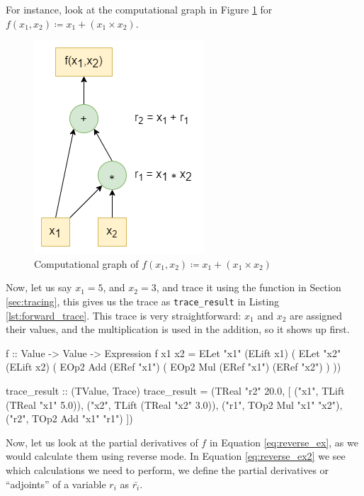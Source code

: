     For instance, look at the computational graph in Figure \ref{fig:forward_graph} for $f(x_1,x_2)\coloneqq x_1+(x_1\times x_2)$.
    \begin{figure}[htb]
        \centering
        \includegraphics[scale=0.5]{diagrams/forward_example.png}
        \caption{Computational graph of $f(x_1,x_2)\coloneqq x_1+(x_1\times x_2)$}
        \label{fig:forward_graph}
    \end{figure}
    Now, let us say $x_1=5$, and $x_2=3$, and trace it using the function in Section \ref{sec:tracing}, this gives us the trace as \texttt{trace\_result} in Listing \ref{lst:forward_trace}.
    This trace is very straightforward: $x_1$ and $x_2$ are assigned their values, and the multiplication is used in the addition, so it shows up first.
    \begin{haskell}[caption=DSL definition of $f$ and its trace, label=lst:forward_trace, gobble=8]
        f :: Value -> Value -> Expression
        f x1 x2 = ELet "x1" (ELift x1) (
            ELet "x2" (ELift x2) (
                EOp2 Add (ERef "x1") (
                    EOp2 Mul (ERef "x1") (ERef "x2")
                )
            ))

        trace_result :: (TValue, Trace)
        trace_result = (TReal "r2" 20.0, [
            ("x1", TLift (TReal "x1" 5.0)),
            ("x2", TLift (TReal "x2" 3.0)),
            ("r1", TOp2 Mul "x1" "x2"),
            ("r2", TOp2 Add "x1" "r1")
        ])
    \end{haskell}
    Now, let us look at the partial derivatives of $f$ in Equation \ref{eq:reverse_ex}, as we would calculate them using reverse mode.
    In Equation \ref{eq:reverse_ex2} we see which calculations we need to perform, we define the partial derivatives or ``adjoints'' of a variable $r_i$ as $\bar{r_i}$.
